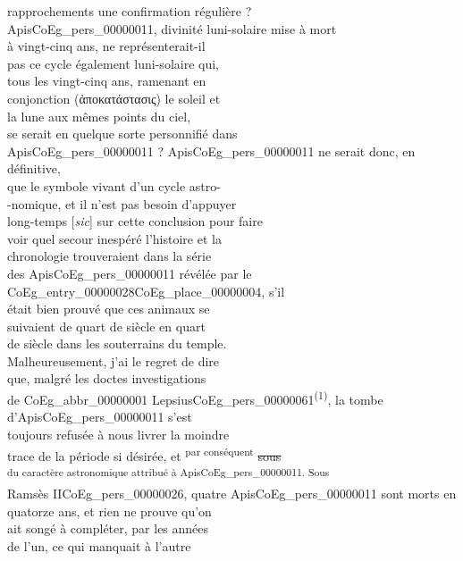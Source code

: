 \documentclass{book}
\begin{document}
{\begin{paracol}{2}
rapprochements une confirmation régulière ?\\
Apis\gls{CoEg_pers_00000011}, divinité luni-solaire mise à mort\\
à vingt-cinq ans, ne représenterait-il\\
pas ce cycle également luni-solaire qui,\\
tous les vingt-cinq ans, ramenant en\\
conjonction (ἀποκατάστασις) le soleil et\\
la lune aux mêmes points du ciel,\\
se serait en quelque sorte personnifié dans\\
Apis\gls{CoEg_pers_00000011} ? Apis\gls{CoEg_pers_00000011} ne serait donc, en définitive,\\
que le symbole vivant d’un cycle astro-\\
-nomique, et il n’est pas besoin d’appuyer\\
long-temps [\textit{sic}] sur cette conclusion pour faire\\
voir quel secour inespéré l’histoire et la\\
chronologie trouveraient dans la série\\
des Apis\gls{CoEg_pers_00000011} révélée par le \Gls{CoEg_entry_00000028}\gls{CoEg_place_00000004}, s’il\\
était bien prouvé que ces animaux se\\
suivaient de quart de siècle en quart\\
de siècle dans les souterrains du temple.\\
Malheureusement, j’ai le regret de dire\\
que, malgré les doctes investigations\\
de \gls{CoEg_abbr_00000001} Lepsius\gls{CoEg_pers_00000061}\textsuperscript{(1)}, la tombe d’Apis\gls{CoEg_pers_00000011} s’est\\
toujours refusée à nous livrer la moindre\\
trace de la période si désirée, et \textsuperscript{par conséquent} \sout{sous}\\
\textsuperscript{du caractère astronomique attribué à Apis\gls{CoEg_pers_00000011}. Sous}\\
Ramsès II\gls{CoEg_pers_00000026}, quatre Apis\gls{CoEg_pers_00000011} sont morts en\\
quatorze ans, et rien ne prouve qu’on\\
ait songé à compléter, par les années\\
de l’un, ce qui manquait à l’autre\\

\end{paracol}}
\end{document}
